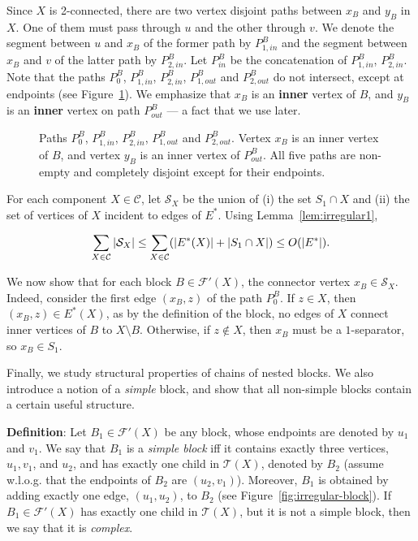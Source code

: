 \documentclass[twoside,leqno,twocolumn]{article}
\newcommand{\tset}{{\mathcal T}}
\newcommand{\cset}{{\mathcal{C}}}
\newcommand{\fset}{{\mathcal{F}}}
\newcommand{\sset}{{\mathcal{S}}}
\newenvironment{Definition}{{\bf Definition}: }{}
\begin{document}
Since $X$ is 2-connected, there are 
two vertex disjoint paths between $x_B$ and $y_B$ in $X$. One of them must pass through $u$
and the other through $v$. We denote the segment between $u$ and $x_B$ of the former path
by $P^B_{1,in}$ and the segment between $x_B$ and $v$ of the latter path by $P^B_{2,in}$.
Let $P^B_{in}$ be the concatenation of $P_{1,in}^B$, $P_{2,in}^B$.
Note that the paths $P_0^B$, $P_{1,in}^B$, $P_{2,in}^B$, $P_{1,out}^B$ and $P_{2,out}^B$
do not intersect, except at endpoints (see Figure~\ref{fig: paths pout2}). We emphasize that $x_B$ is an {\bf inner} vertex of $B$, and $y_B$ is an {\bf inner} vertex on path $P_{out}^B$ --- a fact that we use later.


\begin{figure}[h]
\begin{center}
 \caption{Paths $P_0^B$, $P_{1,in}^B$, $P_{2,in}^B$, $P_{1,out}^B$ and $P_{2,out}^B$. Vertex $x_B$ is an inner vertex of $B$, and vertex $y_B$ is an inner vertex of $P_{out}^B$. All five paths are non-empty and completely disjoint except for their endpoints.} \label{fig: paths pout2}
\end{center}
\end{figure}

For each component $X\in\cset$, let $\sset_X$ be the union of 
(i) the set $S_1\cap X$ and (ii) the set of vertices of $X$ incident to edges of $E^*$. 
 Using Lemma~\ref{lem:irregular1},

\begin{equation}\label{eq: bound SX}
\sum_{X\in \cset} |{\cal S}_X| \leq \sum_{X\in \cset} (|E^*(X)| + |S_1 \cap X|) \leq O(|E^*|).
\end{equation}

We now show that for each block $B\in \fset'(X)$, the connector vertex $x_B\in \sset_X$.
Indeed, consider the first edge $(x_B, z)$ of the path
$P_0^B$. If $z\in X$, then $(x_B, z) \in E^*(X)$, as by the definition
of the block, no edges of $X$ connect inner vertices of $B$ to $X\setminus B$. Otherwise, if $z\notin X$, then $x_B$ must be a $1$-separator, so $x_B\in S_1$. 



Finally, we study structural properties of chains of nested blocks. We also introduce a notion of a \textit{simple} block, and show that all non-simple blocks contain a certain useful structure.

\begin{Definition}
Let $B_1\in \fset'(X)$ be any block, whose endpoints are denoted by $u_1$ and $v_1$. We say that $B_1$ is a \emph{simple block} iff it contains exactly three vertices, $u_1,v_1$, and $u_2$, and has exactly one child in $\tset(X)$, denoted by $B_2$ (assume w.l.o.g. that the endpoints of $B_2$ are $(u_2,v_1)$). Moreover, $B_1$ is obtained by adding exactly one edge, $(u_1,u_2)$, to $B_2$ (see Figure~\ref{fig:irregular-block}). If $B_1\in \fset'(X)$ has exactly one child in $\tset(X)$, but it is not a simple block, then we say that it is \emph{complex}.
\end{Definition}
\end{document}
